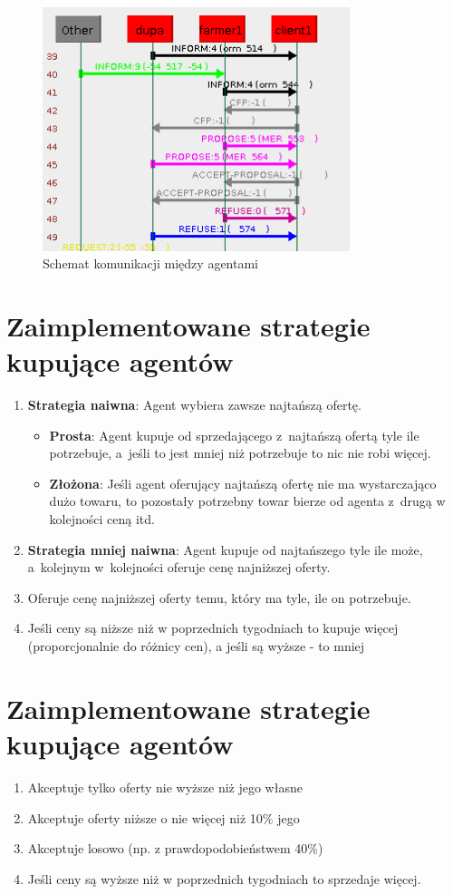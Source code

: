 \documentclass[12pt]{article}
\begin{document}
\begin{figure} [H]
 \centering
 \includegraphics[width=0.8\textwidth]{schemat_komunikacji_v1}
 \caption{Schemat komunikacji między agentami}
 \label{fig:schemat komunikacji}
\end{figure}

\section{Zaimplementowane strategie kupujące agentów}
\begin{enumerate}
 \item \textbf{Strategia naiwna}: Agent wybiera zawsze najtańszą ofertę.
  \begin{itemize}
  \item \textbf{Prosta}: Agent kupuje od sprzedającego z~najtańszą ofertą tyle ile potrzebuje, a~jeśli to jest mniej niż potrzebuje to nic nie robi więcej.
  \item \textbf{Złożona}: Jeśli agent oferujący najtańszą ofertę nie ma wystarczająco dużo towaru, to pozostały potrzebny towar bierze od agenta z~drugą w kolejności ceną itd.
  \end{itemize}
 \item \textbf{Strategia mniej naiwna}: Agent kupuje od najtańszego tyle ile może, a~kolejnym w~kolejności oferuje cenę najniższej oferty.
 \item Oferuje cenę najniższej oferty temu, który ma tyle, ile on potrzebuje.
 \item Jeśli ceny są niższe niż w poprzednich tygodniach to kupuje więcej (proporcjonalnie do różnicy cen), a jeśli są wyższe - to mniej
\end{enumerate}

\section{Zaimplementowane strategie kupujące agentów}
\begin{enumerate}
 \item Akceptuje tylko oferty nie wyższe niż jego własne
 \item Akceptuje oferty niższe o nie więcej niż 10\% jego
 \item Akceptuje losowo (np. z prawdopodobieństwem 40\%)
 \item Jeśli ceny są wyższe niż w poprzednich tygodniach to sprzedaje więcej.
\end{enumerate}
\end{document}
